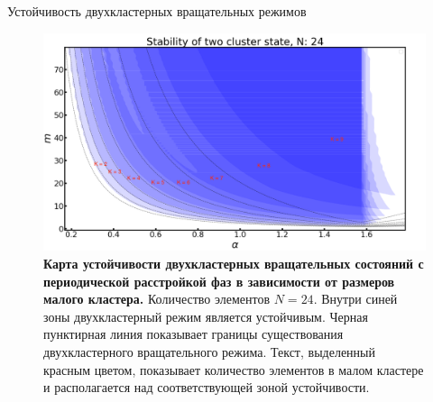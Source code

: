 \begin{chapter}{Устойчивость двухкластерных вращательных режимов}
	\begin{figure}[h!]
		\begin{center}
			\includegraphics[width=1\columnwidth]{pictures/st-map.png}
		\end{center}
		\caption{\textbf{Карта устойчивости двухкластерных вращательных состояний с периодической расстройкой фаз в зависимости от размеров малого кластера.}
		Количество элементов $N = 24$. Внутри синей зоны двухкластерный режим является устойчивым. Черная пунктирная линия показывает
		границы существования двухкластерного вращательного режима. Текст, выделенный красным цветом, показывает количество элементов в малом
		кластере и располагается над соответствующей зоной устойчивости.}
		\label{su-map}
	\end{figure}

\end{chapter}
